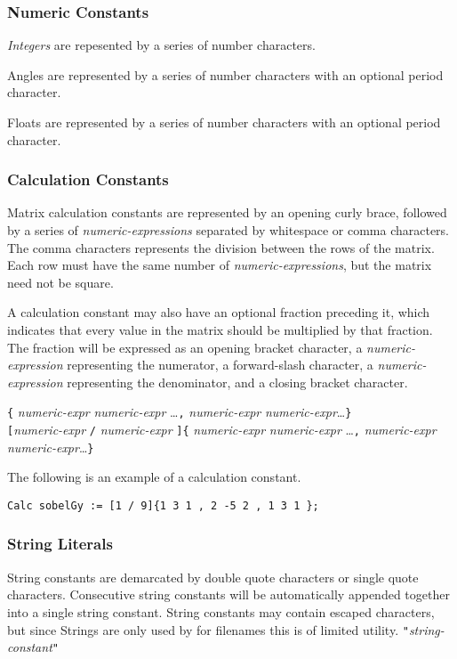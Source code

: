 \subsubsection{Numeric Constants}
\label{sssec:numericconstants}

\emph{Integers} are repesented by a series of number characters.

Angles are represented by a series of number characters with an
optional period character.

Floats are represented by a series of number characters with an
optional period character.

\subsubsection{Calculation Constants}
\label{sssec:calcconstants}
Matrix calculation constants are represented by an opening curly brace, followed
by a series of \emph{numeric-expressions} separated by whitespace or
comma characters. The comma  characters represents the division between
the rows of the matrix. Each row must have the same number of
\emph{numeric-expressions}, but the matrix need not be square.

A calculation constant may also have an optional fraction preceding it,
which indicates that every value in the matrix should be multiplied
by that fraction. The fraction will be expressed as an opening
bracket character, a \emph{numeric-expression} representing the
numerator, a forward-slash character, a \emph{numeric-expression}
representing the denominator, and a closing bracket character.

\startsyn
\texttt{\{} \emph{numeric-expr} \emph{numeric-expr} \ldots \texttt{,} \emph{numeric-expr} \emph{numeric-expr}\ldots \texttt{\}} \\
\texttt{[}\emph{numeric-expr} \texttt{/} \emph{numeric-expr} \texttt{]}\texttt{\{} \emph{numeric-expr} \emph{numeric-expr} \ldots \texttt{,} \emph{numeric-expr} \emph{numeric-expr}\ldots \texttt{\}}
\stopsyn

The following is an example of a calculation constant.
\begin{lstlisting}[language=CLAM,escapechar=\%]
Calc sobelGy := [1 / 9]{1 3 1 , 2 -5 2 , 1 3 1 };
\end{lstlisting}

\subsubsection{String Literals}
\label{sssec:strings}

String constants are demarcated by double quote characters or single
quote characters. Consecutive string constants will be automatically
appended together into a single string constant.
String constants may contain escaped characters, but since Strings
are only used by for filenames this is of limited utility.
\startsyn
\texttt{"}\emph{string-constant}\texttt{"}
\stopsyn
